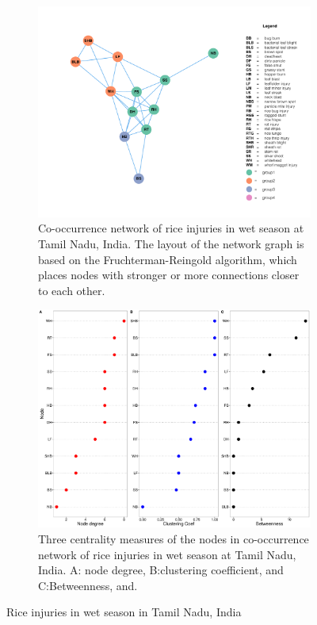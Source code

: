 \begin{figure}
    \centering
    \begin{subfigure}[b]{1\textwidth}
        \includegraphics[width = 1\textwidth]{figures/networkTM_ws.pdf}
        \caption{Co-occurrence network of rice injuries in wet season at Tamil Nadu, India. The layout of the network graph is based on the Fruchterman-Reingold algorithm, which places nodes with stronger or more connections closer to each other.}
        \label{fig:networkTM_ws}
    \end{subfigure}
    \begin{subfigure}[b]{1\textwidth}
        \includegraphics[width = 1\textwidth]{figures/nodepropTM_ws.pdf}
        \caption{Three centrality measures of the nodes in co-occurrence network of rice injuries in wet season at Tamil Nadu, India. A: node degree, B:clustering coefficient, and C:Betweenness, and.}
        \label{fig:nodepropTM_ws}
    \end{subfigure}
    \caption{Rice injuries in wet season in Tamil Nadu, India}
    \label{fig:TM_ws}
\end{figure}

